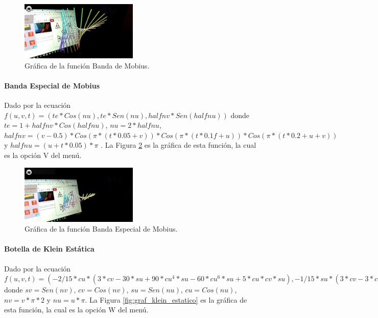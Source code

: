 \begin{figure}[hbt!]
\centering
\includegraphics[width=0.5\textwidth]{figuras/graficas/mobius.png}
\caption{\label{fig:graf_mobius}Gráfica de la función Banda de Mobius.}
\end{figure}
\FloatBarrier

\paragraph{Banda Especial de Mobius}
Dado por la ecuación $f(u,v,t)=(te*Cos(nu),te*Sen(nu),halfnv*Sen(halfnu))$ donde $te = 1 + halfnv * Cos(halfnu)$, $nu = 2 * halfnu$, $halfnv = (v - 0.5) * Cos(\pi * (t * 0.05 + v)) * Cos(\pi * (t * 0.1f + u)) * Cos(\pi * (t * 0.2 + u + v))$ y $halfnu = (u + t * 0.05) * \pi$ . La Figura \ref{fig:graf_mobius_especial} es la gráfica de esta función, la cual es la opción V del menú.

\begin{figure}[hbt!]
\centering
\includegraphics[width=0.5\textwidth]{figuras/graficas/mobius_especial.png}
\caption{\label{fig:graf_mobius_especial}Gráfica de la función Banda Especial de Mobius.}
\end{figure}
\FloatBarrier

\paragraph{Botella de Klein Estática}
Dado por la ecuación $f(u,v,t)=(-2/15 * cu * (3 * cv - 30 * su + 90 * cu^4 * su - 60 * cu^6 * su + 5 * cu * cv * su), -1/15 * su * (3 * cv - 3 * cu^2 * cv - 48 * cu^4 * cv + 48 * cu^6 * cv - 60 * su + 5 * cu * cv * su - 5 * cu^3 * cv * su - 80 * cu^5 * cv * sv + 80 * cu^7 * cv * su) -2, 2/15 * (3 + 5 * cu * su) * sv)$ donde $sv = Sen(nv)$, $cv = Cos(nv)$, $su = Sen(nu)$, $cu = Cos(nu)$, $nv = v * \pi * 2$ y $nu = u * \pi$. La Figura \ref{fig:graf_klein_estatico} es la gráfica de esta función, la cual es la opción W del menú.

